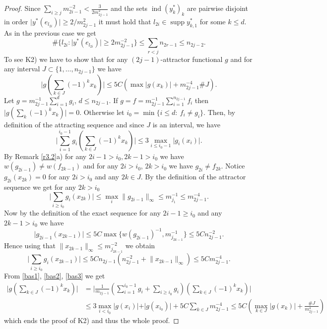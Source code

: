 \documentclass[a4paper]{amsart}
\theoremstyle{plain}
\newcommand{\norm}[1][\cdot]{\lVert #1\rVert}
\DeclareMathOperator{\supp}{supp}
\DeclareMathOperator{\inde}{ind}
\begin{document}
\begin{proof}
Since $\sum_{i\geq j}m_{2i-1}^{-2}<\frac{3}{2m_{2j-1}^{2}}$
and the
sets $\inde(y_{k}^{*})_{k}$ are pairwise disjoint
in
order $\vert y^{*}(e_{l_{2i}})\vert\geq 2/m_{2j-1}^{2}$ it must hold
that  $l_{2i}\in\supp y_{k,1}^{*}$ for some $k\leq d$.
As in
the previous case we get
$$\#\{l_{2i}: \vert y^{*}(e_{l_{2i}})\vert\geq 2m_{2j-1}^{-2}\}\leq \sum_{r<j}n_{2r-1}\leq n_{2j-2}.
$$
To see K2) we have to show that for any $(2j-1)$-attractor
functional $g$ and for any interval $J\subset\{1,\dots,n_{2j-1}\}$
we have
$$
\vert g(\sum_{k\in J}(-1)^kx_k)\vert\leq 5C(\max\vert g(x_k)\vert+m_{2j-1}^{-4}\# J).
$$
Let $g=m_{2j-1}^{-1}\sum_{i=1}^dg_i$, $d\leq n_{2j-1}$. If $g=f=m_{2j-1}^{-1}\sum_{i=1}^{n_{2j-1}}f_{i}$
then $\vert g(\sum_k(-1)^kx_k)\vert=0$. Otherwise let
$i_0=\min\{i\leq d:\ f_i\ne g_i\}$. Then, by definition of the
attracting sequence and since $J$ is an interval, we have
\begin{equation}\label{bas1}
\vert \sum_{i=1}^{i_0-1}g_i(\sum_{k\in J}(-1)^kx_k)\vert\leq 3\max_{i\leq i_0-1}\vert g_{i}(x_{i})\vert.
\end{equation}
By Remark \ref{r3.2}a) for any $2i-1>i_0,2k-1>i_0$ we
have $w(g_{2i-1})\ne w(f_{2k-1})$ and for any $2i>i_0$, $2k>i_0$
we have $g_{2i}\ne f_{2k}$. Notice $g_{2i}(x_{2k})=0$ for any
$2i>i_0$ and any $2k\in J$.
By the definition of the attractor sequence we get for any $2k>i_0$
\begin{equation}\label{bas2}
\vert\sum_{i \geq i_0}g_{i}(x_{2k})\vert\leq \max_{i}\norm[g_{2i-1}]_{\infty}\leq m_{j_1}^{-1}\leq m_{2j-1}^{-4}.
\end{equation}
Now by the definition of the exact sequence for any $2i-1\geq i_0$ and
any $2k-1>i_0$ we have
$$
\vert g_{2i-1}(x_{2k-1})\vert\leq 5C\max\{w(g_{2i-1})^{-1},
m_{j_{2k-1}}^{-1}\}\leq 5Cn_{2j-1}^{-2}.
$$
Hence using that $\norm[x_{2k-1}]_{\infty}\leq m_{j_{2k-1}}^{-2}$ we obtain
\begin{equation}\label{bas3} \vert\sum_{i\geq i_0}g_{i}(x_{2k-1})\vert\leq 5C
n_{2j-1}(n_{2j-1}^{-2}+\norm[x_{2k-1}]_{\infty})\leq 5C m_{2j-1}^{-4}.
\end{equation}
From \eqref{bas1}, \eqref{bas2}, \eqref{bas3} we get
\begin{align*}
\vert g(\sum_{k\in J}(-1)^{k}x_{k})\vert
&=
\vert \frac{1}{m_{2j-1}}(\sum_{i=1}^{i_0-1}g_{i}+\sum_{i\geq i_0}g_{i})(\sum_{k\in J}(-1)^{k}x_{k})\vert
\\
&\leq 3\max_{i<i_0}\vert g(x_i)\vert+\vert g(x_{i_0})\vert+5C\sum_{k\in J} m_{2j-1}^{-4}
\leq
5C(\max_{k\in J}\vert g(x_k)\vert+\frac{\#J}{m_{2j-1}^{4}})
\end{align*}
which ends the proof of K2) and thus the whole proof.
\end{proof}
\end{document}
